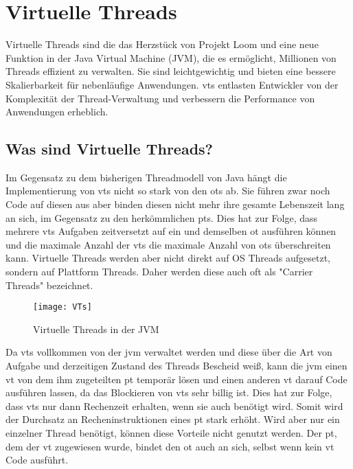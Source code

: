    

\section{Virtuelle Threads}                                 %
\label{sec:VirtuelleThreads}

Virtuelle Threads sind die das Herzstück von Projekt Loom und eine neue Funktion in der Java Virtual Machine (JVM), die es ermöglicht, Millionen von Threads effizient zu verwalten.
Sie sind leichtgewichtig und bieten eine bessere Skalierbarkeit für nebenläufige Anwendungen.
\Glspl{vt} entlasten Entwickler von der Komplexität der Thread-Verwaltung und verbessern die Performance von Anwendungen erheblich.


\subsection{Was sind Virtuelle Threads?}
\label{subsec:WassindVTs?}

    Im Gegensatz zu dem bisherigen Threadmodell von Java hängt die Implementierung von \Glspl{vt} nicht so stark von den \Glspl{ot} ab. Sie führen zwar noch Code 
    auf diesen aus aber binden diesen nicht mehr ihre gesamte Lebenszeit lang an sich, im Gegensatz zu den herkömmlichen \Glspl{pt}. Dies hat zur Folge, 
    dass mehrere \Glspl{vt} Aufgaben zeitversetzt auf ein und demselben \gls{ot} ausführen können und die maximale Anzahl der \Glspl{vt}
    die maximale Anzahl von \Glspl{ot} überschreiten kann.
    Virtuelle Threads werden aber nicht direkt auf OS Threads aufgesetzt, sondern auf Plattform Threads.
    Daher werden diese auch oft als "Carrier Threads" bezeichnet.
    \cite{ieee2022}

    \begin{figure}[H]
        \centering
        \texttt{[image: VTs]}
        \caption{Virtuelle Threads in der JVM}
        \label{fig:VTs}
    \end{figure}

    Da \Glspl{vt} vollkommen von der \gls{jvm} verwaltet werden und diese über die Art von Aufgabe und derzeitigen Zustand des Threads Bescheid weiß, kann die
    \gls{jvm} einen \gls{vt} von dem ihm zugeteilten \gls{pt} temporär lösen und einen anderen \gls{vt} darauf Code ausführen lassen, da das Blockieren von \Glspl{vt}
    sehr billig ist. Dies hat zur Folge, dass \Glspl{vt} nur dann Rechenzeit erhalten, wenn sie auch benötigt wird. Somit wird der Durchsatz an Recheninstruktionen
    eines \gls{pt} stark erhöht.
    Wird aber nur ein einzelner Thread benötigt, können diese Vorteile nicht genutzt werden. Der \gls{pt}, dem der \gls{vt} zugewiesen wurde, bindet den \gls{ot} auch
    an sich, selbst wenn kein \gls{vt} Code ausführt.
    \cite{JEP444}

